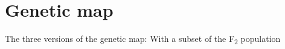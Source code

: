 



\section{Genetic map} 
\label{yr15:geneticMap}
The three versions of the genetic map: With a subset of the F\textsubscript{2} population

